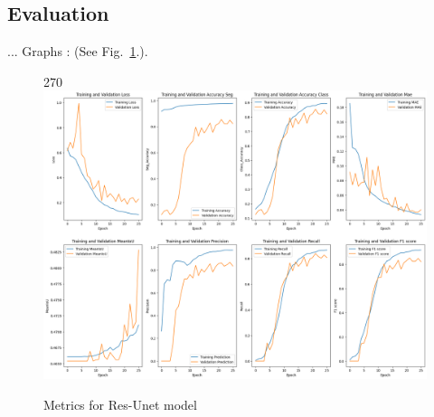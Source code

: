 \documentclass[12pt]{article}
\begin{document}
\clearpage
\newpage

\subsection{Evaluation}
...
Graphs : (See Fig.~\ref{fig:graphs}.).
\begin{figure}[p]
    \centering
    \begin{turn}{270}
    \includegraphics[width=1\paperwidth,height=1\paperheight,keepaspectratio]{./graphics/graphs.png}
    \end{turn}
    \caption{Metrics for Res-Unet model}
    \label{fig:graphs}
\end{figure}
\restoregeometry
\end{document}
